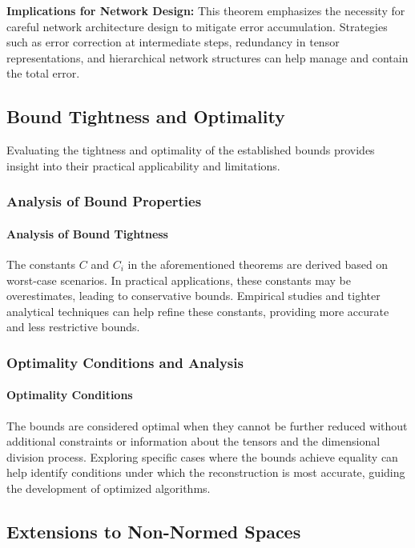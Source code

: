 \documentclass[sn-mathphys-num]{sn-jnl}
\theoremstyle{thmstyleone}
\theoremstyle{thmstyletwo}
\theoremstyle{thmstylethree}
\begin{document}
\textbf{Implications for Network Design:} This theorem emphasizes the necessity for careful network architecture design to mitigate error accumulation. Strategies such as error correction at intermediate steps, redundancy in tensor representations, and hierarchical network structures can help manage and contain the total error.

\subsection{Bound Tightness and Optimality}

Evaluating the tightness and optimality of the established bounds provides insight into their practical applicability and limitations.

\subsubsection{Analysis of Bound Properties}
\paragraph{Analysis of Bound Tightness}
The constants $C$ and $C_i$ in the aforementioned theorems are derived based on worst-case scenarios. In practical applications, these constants may be overestimates, leading to conservative bounds. Empirical studies and tighter analytical techniques can help refine these constants, providing more accurate and less restrictive bounds.

\subsubsection{Optimality Conditions and Analysis}
\paragraph{Optimality Conditions}
The bounds are considered optimal when they cannot be further reduced without additional constraints or information about the tensors and the dimensional division process. Exploring specific cases where the bounds achieve equality can help identify conditions under which the reconstruction is most accurate, guiding the development of optimized algorithms.

\subsection{Extensions to Non-Normed Spaces}
\end{document}
